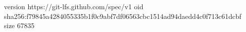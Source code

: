 version https://git-lfs.github.com/spec/v1
oid sha256:f79845a4284055335b1f0c9abf7df06563cbc1514ad94daedd4c0f713c61dcbf
size 67835

